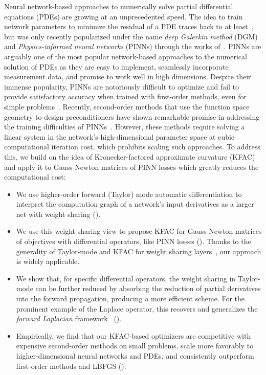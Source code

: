 Neural network-based approaches to numerically solve partial differential equations (PDEs) are growing at an unprecedented speed.
The idea to train network parameters to minimize the residual of a PDE traces back to at least~\citet{dissanayake1994neural, lagaris1998artificial}, but was only recently popularized under the name \emph{deep Galerkin method} (DGM) and \emph{Physics-informed neural networks} (PINNs) through the works of~\citet{sirignano2018dgm, raissi2019physics}.
PINNs are arguably one of the most popular network-based approaches to the numerical solution of PDEs as they are easy to implement, seamlessly incorporate measurement data, and promise to work well in high dimensions.
Despite their immense popularity, PINNs are notoriously difficult to optimize \citep{wang2021understanding} and fail to provide satisfactory accuracy when trained with first-order methods, even for simple problems~\citep{zeng2022competitive, muller2023achieving}.
Recently, second-order methods that use the function space geometry to design preconditioners have shown remarkable promise in addressing the training difficulties of PINNs~\citep{zeng2022competitive, muller2023achieving, de2023operator,jnini2024gauss, muller2024optimization}.
However, these methods require solving a linear system in the network's high-dimensional parameter space at cubic computational iteration cost, which prohibits scaling such approaches.
To address this, we build on the idea of Kronecker-factored approximate curvature (KFAC) and apply it to Gauss-Newton matrices of PINN losses which greatly reduces the computational cost:
\begin{itemize}
\item We use higher-order forward (Taylor) mode automatic differentiation to interpret the computation graph of a network's input derivatives as a larger net with weight sharing ().

\item We use this weight sharing view to propose KFAC for Gauss-Newton matrices of objectives with differential operators, like PINN losses ().
  Thanks to the generality of Taylor-mode and KFAC for weight sharing layers~\cite{eschenhagen2023kroneckerfactored}, our approach is widely applicable.

\item We show that, for specific differential operators, the weight sharing in Taylor-mode can be further reduced by absorbing the reduction of partial derivatives into the forward propagation, producing a more efficient scheme.
  For the prominent example of the Laplace operator, this recovers and generalizes the \emph{forward Laplacian} framework~\cite{li2023forward} ().

\item Empirically, we find that our KFAC-based optimizers are competitive with expensive second-order methods on small problems, scale more favorably to higher-dimensional neural networks and PDEs, and consistently outperform first-order methods and LBFGS ().
\end{itemize}

